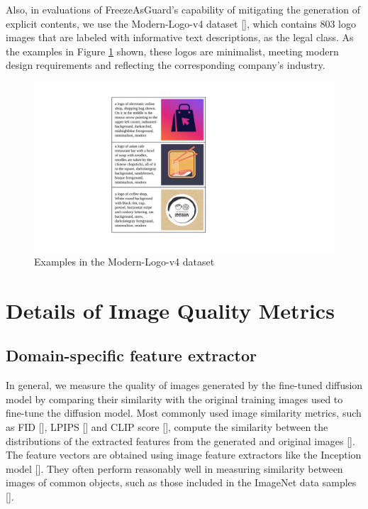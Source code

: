 \documentclass{article}
\begin{document}
Also, in evaluations of FreezeAsGuard's capability of mitigating the generation of explicit contents, we use the Modern-Logo-v4 dataset [], which contains 803 logo images that are labeled with informative text descriptions, as the legal class.  As the examples in Figure \ref{fig:dataset_examples_logo} shown, these logos are minimalist, meeting modern design requirements and reflecting the corresponding company's industry.

\begin{figure}[h]
	\centering
	\vspace{-0.05in}
	\includegraphics[width=0.7\linewidth]{figures/logo_examples.pdf}
	\caption{Examples in the Modern-Logo-v4 dataset}
	\label{fig:dataset_examples_logo}
\end{figure}

\section{Details of Image Quality Metrics}\label{sec:metrics_details}

\subsection{Domain-specific feature extractor}\label{sec:metrics_details_feature_extractor}

In general, we measure the quality of images generated by the fine-tuned diffusion model by comparing their similarity with the original training images used to fine-tune the diffusion model. Most commonly used image similarity metrics, such as FID [], LPIPS [] and CLIP score [], compute the similarity between the distributions of the extracted features from the generated and original images []. The feature vectors are obtained using image feature extractors like the Inception model []. They often perform reasonably well in measuring similarity between images of common objects, such as those included in the ImageNet data samples [].
\end{document}
